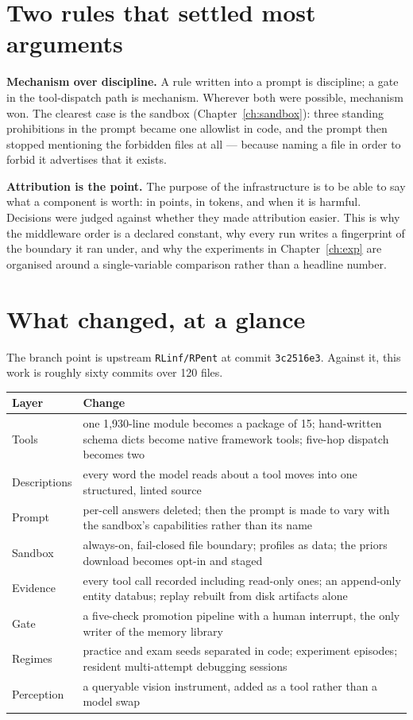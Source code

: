 \documentclass[11pt,a4paper]{report}
\newcommand{\keyrule}[1]{\textbf{\textcolor{acc}{#1}}}
\begin{document}
\section{Two rules that settled most arguments}

\keyrule{Mechanism over discipline.} A rule written into a prompt is discipline; a
gate in the tool-dispatch path is mechanism. Wherever both were possible,
mechanism won. The clearest case is the sandbox (Chapter~\ref{ch:sandbox}): three standing
prohibitions in the prompt became one allowlist in code, and the prompt then
stopped mentioning the forbidden files at all --- because naming a file in order
to forbid it advertises that it exists.

\keyrule{Attribution is the point.} The purpose of the infrastructure is to be able
to say what a component is worth: in points, in tokens, and when it is harmful.
Decisions were judged against whether they made attribution easier. This is why
the middleware order is a declared constant, why every run writes a fingerprint
of the boundary it ran under, and why the experiments in Chapter~\ref{ch:exp} are
organised around a single-variable comparison rather than a headline number.

\section{What changed, at a glance}

The branch point is upstream \texttt{RLinf/RPent} at commit \texttt{3c2516e3}.
Against it, this work is roughly sixty commits over 120 files.

\begin{table}[htbp]
\centering\small
\begin{tabularx}{\textwidth}{@{}l X@{}}
\toprule
\textbf{Layer} & \textbf{Change} \\
\midrule
Tools & one 1{,}930-line module becomes a package of 15; hand-written schema dicts become native framework tools; five-hop dispatch becomes two \\
Descriptions & every word the model reads about a tool moves into one structured, linted source \\
Prompt & per-cell answers deleted; then the prompt is made to vary with the sandbox's capabilities rather than its name \\
Sandbox & always-on, fail-closed file boundary; profiles as data; the priors download becomes opt-in and staged \\
Evidence & every tool call recorded including read-only ones; an append-only entity databus; replay rebuilt from disk artifacts alone \\
Gate & a five-check promotion pipeline with a human interrupt, the only writer of the memory library \\
Regimes & practice and exam seeds separated in code; experiment episodes; resident multi-attempt debugging sessions \\
Perception & a queryable vision instrument, added as a tool rather than a model swap \\
\bottomrule
\end{tabularx}
\end{table}
\end{document}
